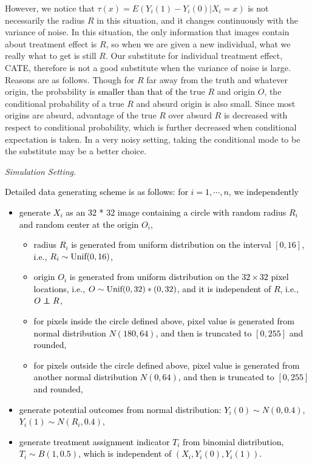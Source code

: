 \documentclass[11pt,paper=letter]{scrartcl}
\def\Unif{\textnormal{Unif}}
\newcommand\independent{\protect\mathpalette{\protect\independenT}{\perp}}
\def\independenT#1#2{\mathrel{\rlap{$#1#2$}\mkern2mu{#1#2}}}
\newcommand\hz[1]{\textcolor{black}{#1}}
\begin{document}
However, we notice that $\tau(x) = E(Y_i(1)-Y_i(0) | X_i = x)$ is not necessarily the radius $R$ in this situation, and it changes continuously with the variance of noise. In this situation, the only information that images contain about treatment effect is $R$, so when we are given a new individual, what we really what to get is still $R$. Our substitute for individual treatment effect, CATE, therefore is not a good substitute when the variance of noise is large. Reasons are as follows. Though for $R$ far away from the truth and whatever origin, the probability is \hz{smaller than that of the} true $R$ and origin $O$, the conditional probability of a true $R$ and absurd origin is also small. Since most origins are absurd, advantage of the true $R$ over absurd $R$ is decreased with respect to conditional probability, which is further decreased when conditional expectation is taken. In a very noisy setting, taking the conditional mode to be the substitute may be a better choice. 



\noindent  \textit{Simulation Setting.}


\hz{Detailed data generating scheme is as follows: for $i=1,\cdots,n$, we independently
\begin{itemize}
\item generate $X_i$ as an 32 * 32 image \hz{containing a circle with random radius $R_i$ and random center at the origin $O_i$},
\begin{itemize}
\item radius $R_i$ is generated from uniform distribution on the interval $[0,16]$, i.e., $R_i \sim \Unif(0,16)$,
\item origin $O_i$ is generated from uniform distribution on the $32 \times 32$ pixel locations, i.e., $O \sim \Unif (0,32)*(0,32) $, and it is independent of $R$, i.e., $ O \independent R$,
\item for pixels inside the circle defined above, pixel value is generated from normal distribution $N(180,64)$, and then is truncated to $[0,255]$ and rounded,
\item for pixels outside the circle defined above, pixel value is generated from another normal distribution $N(0,64)$, and then is truncated to $[0,255]$ and rounded,
\end{itemize}
\item generate potential outcomes from normal distribution: $Y_i(0) \sim N(0,0.4)$, $Y_i(1) \sim N(R_i,0.4)$,
\item generate treatment assignment indicator $T_i$ from binomial distribution, $T_i \sim B(1,0.5)$, which is independent of $(X_i, Y_i(0),Y_i(1))$.
\end{itemize}
}
\end{document}
